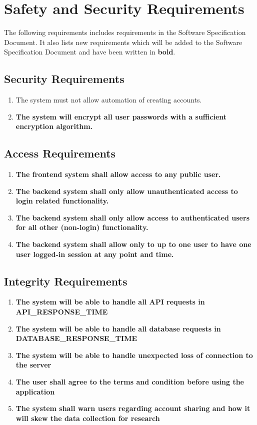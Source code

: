 \documentclass{article}
\begin{document}
\section{Safety and Security Requirements}
The following requirements includes requirements in the Software Specification Document. It also lists new requirements which will be added to the Software Specification Document and have been written in \textbf{bold}. 

\subsection{Security Requirements}
\begin{enumerate}[{SR}1. ]
    \item The system must not allow automation of creating accounts. 
    \item \textbf{The system will encrypt all user passwords with a sufficient encryption algorithm.}
\end{enumerate}
\subsection{Access Requirements}
\begin{enumerate}[{ACR}1. ]
    \item \textbf{The frontend system shall allow access to any public user.}
    \item \textbf {The backend system shall only allow unauthenticated access to login related functionality.}
    \item \textbf{The backend system shall only allow access to authenticated users for all other (non-login) functionality.}
    \item \textbf{The backend system shall allow only to up to one user to have one user logged-in session at any point and time.}
    
\end{enumerate}
\subsection{Integrity Requirements}
\begin{enumerate}[{IR}1. ]
    \item \textbf{The system will be able to handle all API requests in API\_RESPONSE\_TIME}
    \item \textbf{The system will be able to handle all database requests in DATABASE\_RESPONSE\_TIME}
    \item \textbf{The system will be able to handle unexpected loss of connection to the server}
    \item \textbf{The user shall agree to the terms and condition before using the application }
    \item \textbf{The system shall warn users regarding account sharing and how it will skew the data collection for research}
\end{enumerate}
\end{document}
